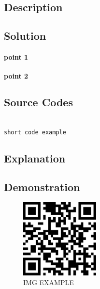 \documentclass{book}
\begin{document}
\subsection{Description}

\subsection{Solution}

\paragraph{point 1}

\paragraph{point 2}

\subsection{Source Codes}

\begin{minipage}[r]{15em}
\begin{verbatim}

short code example

\end{verbatim}
\end{minipage}

\subsection{Explanation}

\subsection{Demonstration}

\begin{figure}[H]
\centering
\includegraphics[height=4.0cm,width=4.0cm]{img/yhb_1.jpg}
\caption{IMG EXAMPLE}
\end{figure}
\end{document}
